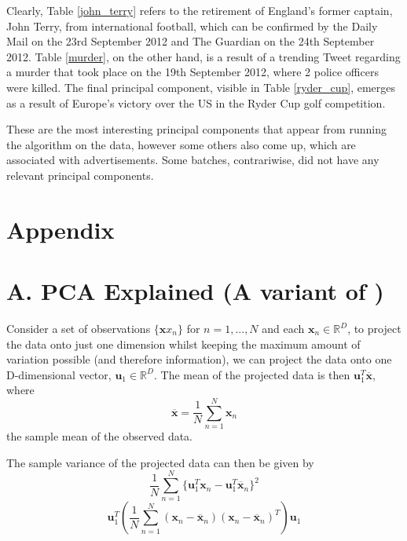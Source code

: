 \documentclass[11pt,a4paper]{article}
\begin{document}
Clearly, Table \ref{john_terry} refers to the retirement of England's former captain, John Terry, from international football, which can be confirmed by the Daily Mail on the 23rd September 2012 and The Guardian on the 24th September 2012. Table \ref{murder}, on the other hand, is a result of a trending Tweet regarding a murder that took place on the 19th September 2012, where 2 police officers were killed. The final principal component, visible in Table \ref{ryder_cup}, emerges as a result of Europe's victory over the US in the Ryder Cup golf competition. 

These are the most interesting principal components that appear from running the algorithm on the data, however some others also come up, which are associated with advertisements. Some batches, contrariwise, did not have any relevant principal components.

\clearpage


\clearpage

\section*{Appendix}\label{appendixa}

\appendix
{}

\section*{A. PCA Explained (A variant of \cite{bishop})}

Consider a set of observations $\{\mathbf{x}x_n\}$ for $n = 1, ..., N$ and each $\mathbf{x}_n \in \mathbb{R}^D$, to project the data onto just one dimension whilst keeping the maximum amount of variation possible (and therefore information), we can project the data onto one D-dimensional vector, $\mathbf{u}_1 \in \mathbb{R}^D$. The mean of the projected data is then $\mathbf{u}_1^T \mathbf{\overline{x}}$, where
\begin{equation*}
\mathbf{\overline{x}} = \frac{1}{N} \sum_{n = 1}^N \mathbf{x}_n 
\end{equation*} 
the sample mean of the observed data.

The sample variance of the projected data can then be given by
\begin{equation*}
\frac{1}{N} \sum_{n = 1}^N \{\mathbf{u}_1^T\mathbf{x}_n -  \mathbf{u}_1^T\mathbf{\overline{x}}_n\}^2
\end{equation*} 
\begin{equation*}
\mathbf{u}_1^T \left( \frac{1}{N} \sum_{n = 1}^N \left(\mathbf{x}_n - \mathbf{\overline{x}}_n\right)\left(\mathbf{x}_n - \mathbf{\overline{x}}_n\right)^T \right) \mathbf{u}_1
\end{equation*} 
\end{document}
